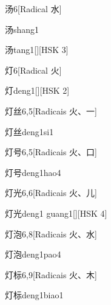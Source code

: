 \begin{entry}{汤}{6}[Radical ⽔]
  \begin{phonetics}{汤}{shang1}
  \end{phonetics}
  \begin{phonetics}{汤}{tang1}[][HSK 3]
  \end{phonetics}
\end{entry}

\begin{entry}{灯}{6}[Radical ⽕]
  \begin{phonetics}{灯}{deng1}[][HSK 2]
  \end{phonetics}
\end{entry}

\begin{entry}{灯丝}{6,5}[Radicais ⽕、⼀]
  \begin{phonetics}{灯丝}{deng1si1}
  \end{phonetics}
\end{entry}

\begin{entry}{灯号}{6,5}[Radicais ⽕、⼝]
  \begin{phonetics}{灯号}{deng1hao4}
  \end{phonetics}
\end{entry}

\begin{entry}{灯光}{6,6}[Radicais ⽕、⼉]
  \begin{phonetics}{灯光}{deng1 guang1}[][HSK 4]
  \end{phonetics}
\end{entry}

\begin{entry}{灯泡}{6,8}[Radicais ⽕、⽔]
  \begin{phonetics}{灯泡}{deng1pao4}
  \end{phonetics}
\end{entry}

\begin{entry}{灯标}{6,9}[Radicais ⽕、⽊]
  \begin{phonetics}{灯标}{deng1biao1}
  \end{phonetics}
\end{entry}

